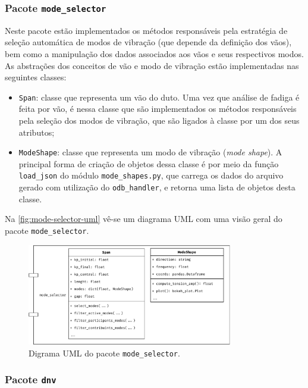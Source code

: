 \subsubsection{Pacote \texttt{mode\_selector}}


Neste pacote estão implementados os métodos responsáveis pela estratégia de seleção automática de modos de vibração (que depende da definição dos vãos), bem como a manipulação dos dados associados aos vãos e seus respectivos modos. As abstrações dos conceitos de vão e modo de vibração estão implementadas nas seguintes classes:

\begin{itemize}
    \item \texttt{Span}: classe que representa um vão do duto. Uma vez que análise de fadiga é feita por vão, é nessa classe que são implementados os métodos responsáveis pela seleção dos modos de vibração, que são ligados à classe por um dos seus atributos;

    \item \texttt{ModeShape}: classe que representa um modo de vibração (\textit{mode shape}). A principal forma de criação de objetos dessa classe é por meio da função \texttt{load\_json} do módulo \texttt{mode\_shapes.py}, que carrega os dados do arquivo gerado com utilização do \texttt{odb\_handler}, e retorna uma lista de objetos desta classe.
\end{itemize}

Na \autoref{fig:mode-selector-uml} vê-se um diagrama UML com uma visão geral do pacote \texttt{mode\_selector}.

\begin{figure}[!ht]
    \centering
    \caption{Digrama UML do pacote \texttt{mode\_selector}.}\label{fig:mode-selector-uml}
    \includegraphics[width=0.8\textwidth]{imagens/mode-selector-uml}
\end{figure}


\subsubsection{Pacote \texttt{dnv}}

